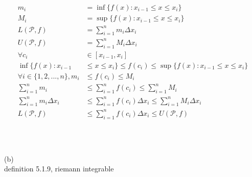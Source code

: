 \documentclass[12pt, border = 4pt, multi]{article} %
\begin{document}
\begin{align*}
m_i &= \inf\{f(x): x_{i - 1} \leq x \leq x_i\}\\
M_i &= \sup\{f(x): x_{i - 1} \leq x \leq x_i\}\\
L(\mathcal{P}, f) &= \sum_{i = 1} ^ n m_i \Delta x_i\\
U(\mathcal{P}, f) &= \sum_{i = 1} ^ n M_i \Delta x_i\\
\forall c_i &\in [x_{i - 1}, x_i]\\
\inf\{f(x): x_{i - 1} &\leq x \leq x_i\} \leq f(c_i) \leq \sup\{f(x): x_{i - 1} \leq x \leq x_i\}\\
\forall i \in \{1, 2, ..., n\}, m_i &\leq f(c_i) \leq M_i\\
\sum_{i = 1} ^ n m_i &\leq \sum_{i = 1} ^ n f(c_i) \leq \sum_{i = 1} ^ n M_i\\ 
\sum_{i = 1} ^ n m_i \Delta x_i &\leq \sum_{i = 1} ^ n f(c_i)\Delta x_i \leq \sum_{i = 1} ^ n M_i \Delta x_i\\
L(\mathcal{P}, f) &\leq \sum_{i = 1} ^ n f(c_i)\Delta x_i \leq U(\mathcal{P}, f)\\
\end{align*}
\\
\\
\\
(b)\\
definition 5.1.9, riemann integrable
\end{document}
